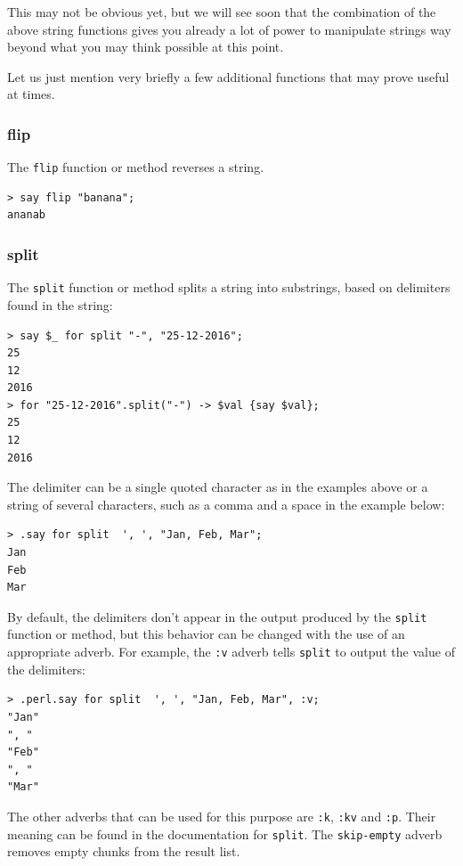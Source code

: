 This may not be obvious yet, but we will see soon 
that the combination of the above string functions gives you 
already a lot of power to manipulate strings way beyond what 
you may think possible at this point.

Let us just mention very briefly a few additional functions 
that may prove useful at times.

\subsubsection{flip}

The {\tt flip} function or method reverses a string.

\begin{verbatim}
> say flip "banana";
ananab
\end{verbatim}
%

\subsubsection{split}
The {\tt split} function or method splits a string 
into substrings, based on delimiters found in the string:

\begin{verbatim}
> say $_ for split "-", "25-12-2016";
25
12
2016
> for "25-12-2016".split("-") -> $val {say $val};
25
12
2016
\end{verbatim}

The delimiter can be a single quoted character as in the 
examples above or a string of several characters, such as 
a comma and a space in the example below:

\begin{verbatim}
> .say for split  ', ', "Jan, Feb, Mar";
Jan
Feb
Mar
\end{verbatim}

By default, the delimiters don't appear in the output produced 
by the {\tt split} function or method, but this behavior can 
be changed with the use of an appropriate adverb. For example, 
the {\tt :v} adverb tells {\tt split} to output the 
value of the delimiters:

\begin{verbatim}
> .perl.say for split  ', ', "Jan, Feb, Mar", :v;
"Jan"
", "
"Feb"
", "
"Mar"
\end{verbatim}

The other adverbs that can be used for this purpose are 
{\tt :k}, {\tt :kv} and {\tt :p}. Their meaning can be 
found in the documentation for {\tt split}. The {\tt skip-empty} 
adverb removes empty chunks from the result list.

